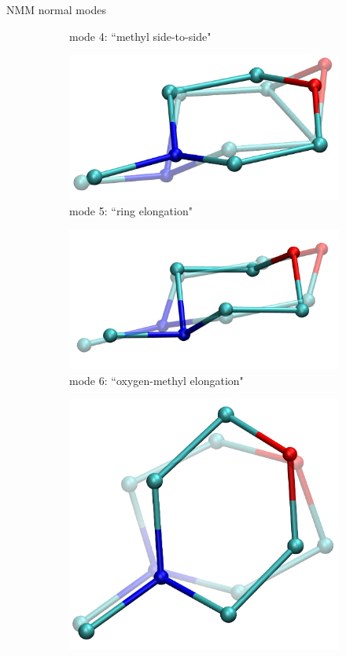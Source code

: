 \documentclass{beamer}
\begin{document}
\begin{frame}{NMM normal modes}
\begin{figure}
\begin{subfigure}{\x\textwidth}
			\caption{mode 4: ``methyl side-to-side"}
		\end{subfigure}
		\begin{subfigure}{\x\textwidth}
			\includegraphics[width=\textwidth]{mode5_ot.png}
			\caption{mode 5: ``ring elongation"}
		\end{subfigure}				
		\begin{subfigure}{\x\textwidth}
			\includegraphics[width=\textwidth]{mode6_ot.png}
			\caption{mode 6: ``oxygen-methyl elongation"}
		\end{subfigure}
		\begin{subfigure}{\x\textwidth}
			\includegraphics[width=\textwidth]{mode7_ot.png}

\end{subfigure}
\end{figure}
\end{frame}
\end{document}
